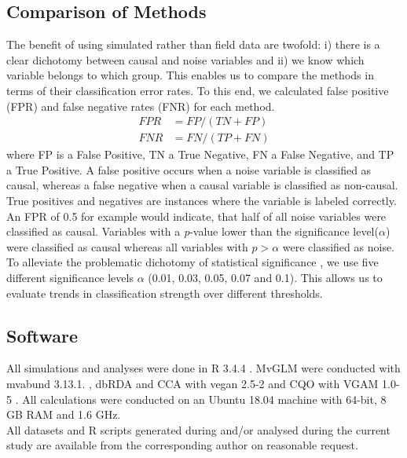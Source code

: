 \documentclass[a4paper,11pt]{article}
\begin{document}
	\subsection{Comparison of Methods}
        The benefit of using simulated rather than field data are twofold:
        i) there is a clear dichotomy between causal and noise variables and 
        ii) we know which variable belongs to which group. 
        This enables us to compare the methods in terms of their classification error rates.
        To this end, we calculated false positive (FPR) and false negative rates (FNR) for each method.
        \begin{align}
           FPR &= FP /(TN + FP) \\        
           FNR &=  FN / (TP + FN)
        \end{align}
        where FP is a False Positive, TN a True Negative, FN a False Negative, and TP a True Positive. 
        A false positive occurs when a noise variable is classified as causal, whereas a false negative when a causal variable is classified as non-causal. 
        True positives and negatives are instances where the variable is labeled correctly. 
        An FPR of 0.5 for example would indicate, that half of all noise variables were classified as causal. 
        Variables with a \textit{p}-value lower than the significance level($\alpha$) were classified as causal whereas all variables with $p > \alpha $  were classified as noise.
        To alleviate the problematic dichotomy of statistical significance \citep{Greenland2016}, we use five different significance levels $\alpha$ (0.01, 0.03, 0.05, 0.07 and 0.1).
		This allows us to evaluate trends in classification strength over different thresholds. 
        

	\subsection{Software}
		All simulations and analyses were done in R 3.4.4 \citep{RCT2018}.
		MvGLM were conducted with mvabund 3.13.1. \citep{Wang2019}, dbRDA and CCA with vegan 2.5-2 \citep{Oksanen2018} and CQO with VGAM 1.0-5 \citep{VGAM19}. 
		All calculations were conducted on an Ubuntu 18.04 machine with 64-bit, 8 GB RAM and 1.6 GHz.\\
		All datasets and R scripts generated during and/or analysed during the current study are available from the corresponding author on reasonable request.
\end{document}
